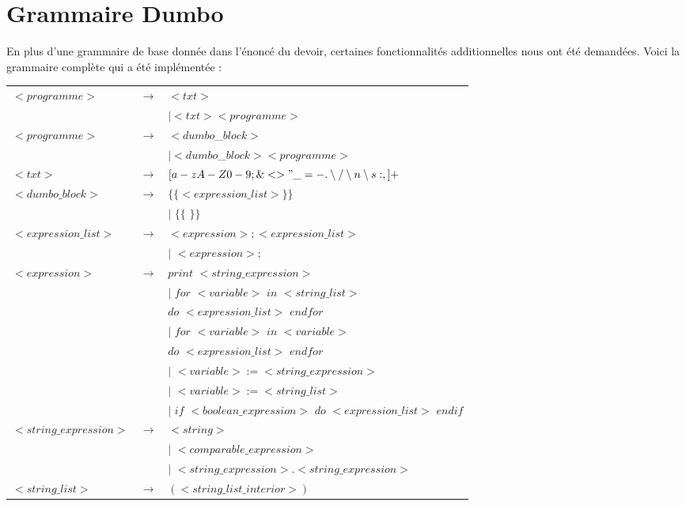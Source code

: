 \documentclass[11pt]{article}
\begin{document}
\section{Grammaire Dumbo}
En plus d'une grammaire de base donnée dans l'énoncé du devoir, certaines fonctionnalités additionnelles nous ont été demandées. Voici la grammaire complète qui a été implémentée :
\begin{center}
\begin{tabular}{|lcl|}
\hline
$<programme>$ 					& $\rightarrow$ 	& $<txt>$\\
								&					& $|<txt><programme>$\\
$<programme>$ 					& $\rightarrow$ 	& $<dumbo$\_$block>$\\
								&					& $|<dumbo$\_$block><programme>$\\
$<txt>$							& $\rightarrow$  	& $[a-zA-Z0-9;\&<>"\_ =-.\setminus / \setminus n\setminus s:,]+$\\
$<dumbo\_ block>$				& $\rightarrow$ 	& $\{\{<expression\_ list>\}\}$\\
								&					& $|$ $\{\{$   $\}\}$\\
$<expression\_ list>$ 			& $\rightarrow$     & $<expression>;<expression\_ list>$\\
								&					& $|$ $<expression>;$\\
$<expression>$					& $\rightarrow$ 	& $print$ $<string\_ expression>$\\
								&					& $|$ $for$ $<variable>$ $in$ $<string\_ list>$\\
								&					& $do$ $<expression\_ list>$ $endfor$\\
								&					& $|$ $for$ $<variable>$ $in$ $<variable>$\\
								&					& $do$ $<expression\_ list>$ $endfor$\\
								&					& $|$ $<variable>:=<string\_ expression>$\\
								&					& $|$ $<variable>:=<string\_ list>$\\
								&					& $|$ $if$ $<boolean\_ expression>$ $do$ $<expression\_ list>$ $endif$\\
$<string\_ expression>$ 		& $\rightarrow$ 	& $<string>$\\
								&					& $|$ $<comparable\_ expression>$\\
								&					& $|$ $<string\_ expression>.<string\_ expression>$\\
$<string\_ list>$ 				& $\rightarrow$		& $(<string\_ list\_ interior>)$\\

\end{tabular}
\end{center}
\end{document}
